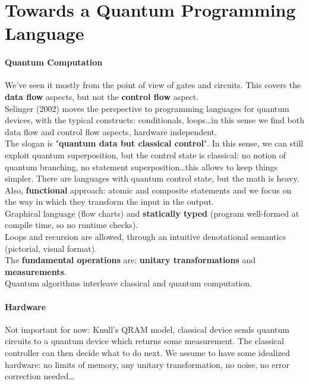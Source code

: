 \documentclass[10pt]{report}
\begin{document}
\section{Towards a Quantum Programming Language}
\paragraph{Quantum Computation} We've seen it mostly from the point of view of gates and circuits. This covers the \textbf{data flow} aspects, but not the \textbf{control flow} aspect.\\
Selinger (2002) moves the perspective to programming languages for quantum devices, with the typical constructs: conditionals, loops\ldots in this sense we find both data flow and control flow aspects, hardware independent.\\
The slogan is "\textbf{quantum data but classical control}". In this sense, we can still exploit quantum superposition, but the control state is classical: no notion of quantum branching, no statement superposition\ldots this allows to keep things simpler. There are languages with quantum control state, but the math is heavy.\\
Also, \textbf{functional} approach: atomic and composite statements and we focus on the way in which they transform the input in the output.\\
Graphical language (flow charts) and \textbf{statically typed} (program well-formed at compile time, so no runtime checks).\\
Loops and recursion are allowed, through an intuitive denotational semantics (pictorial, visual format).\\
The \textbf{fundamental operations} are: \textbf{unitary transformations} and \textbf{measurements}.\\
Quantum algorithms interleave classical and quantum computation.
\paragraph{Hardware} Not important for now: Knull's QRAM model, classical device sends quantum circuits to a quantum device which returns some measurement. The classical controller can then decide what to do next. We assume to have some idealized hardware: no limits of memory, any unitary transformation, no noise, no error correction needed\ldots
\end{document}
